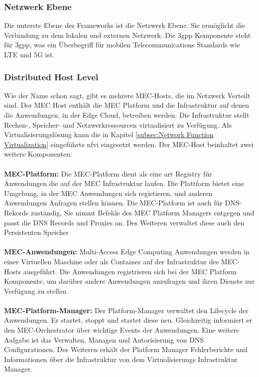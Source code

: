 \documentclass[runningheads]{llncs}
\numberwithin{figure}{section}
\begin{document}
\subsubsection{Netzwerk Ebene}
Die unterste Ebene des Frameworks ist die Netzwerk Ebene. Sie ermöglicht die Verbindung zu dem lokalen und 
externen Netzwerk. Die \acrshort{3gpp} Komponente steht für \acrlong{3gpp}, was ein Überbegriff für mobilen
Telecommunications Standards wie LTE und 5G ist. 
\subsubsection{Distributed Host Level}
Wie der Name schon sagt, gibt es mehrere MEC-Hosts, die im Netzwerk Verteilt sind.
Der MEC Host enthält die MEC Platform und die Infrastruktur auf denen die Anwendungen, in der Edge Cloud, betreiben werden.
Die Infrastruktur stellt Rechen-, Speicher- und Netzwerkressourcen virtualisiert zu Verfügung. Als Virtualisierungslösung kann
die in Kapitel \ref{subsec:Network Function Virtualization} eingeführte \acrlong{nfvi}
eingesetzt werden. Der MEC-Host beinhaltet zwei weitere Komponenten:
\\
\\
\textbf{MEC-Platform:} Die MEC-Platform dient als eine art Registry für  
Anwendungen die auf der MEC Infrastruktur laufen. Die Plattform bietet eine Umgebung, in der MEC Anwendungen sich registieren,
und anderen Anwendungen Anfragen stellen können. Die MEC-Platform ist auch für DNS-Rekords zuständig. Sie nimmt Befehle
des MEC Platform Managers entgegen und passt die DNS Records und Proxies an. Des Weiteren verwaltet diese auch den Persistenten Speicher
\\
\\
\textbf{MEC-Anwendungen:} Multi-Access Edge Computing Anwendungen werden in einer Virtuellen Maschine oder als
Container auf der Infrastruktur des MEC-Hosts ausgeführt. Die Anwendungen registrieren sich bei der MEC Platform
Komponente, um darüber andere Anwendungen anzufragen und ihren Dienste zur Verfügung zu stellen.
\\
\\
\textbf{MEC-Platform-Manager:} Der Platform-Manager verwaltet den Lifecycle der Anwendungen. Er startet, stoppt und startet diese neu.
Gleichzeitig informiert er den MEC-Orchestrator über wichtige Events der Anwendungen. 
Eine weitere Aufgabe ist das Verwalten, Managen und Autorisierung von DNS Configurationen.
Des Weiteren erhält der Platform Manager Fehlerberichte und Informationen über die Infrastruktur von dem Virtualisierungs Infrastruktur Manager.
\end{document}

